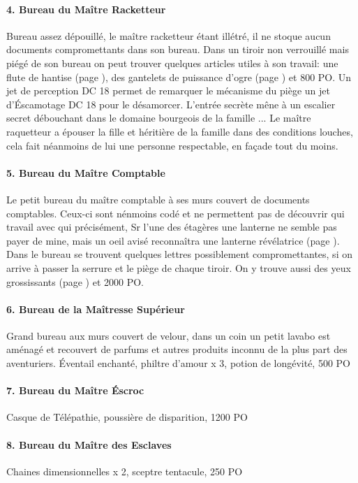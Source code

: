 \paragraph{4. Bureau du Maître Racketteur} Bureau assez dépouillé, le maître
racketteur étant illétré, il ne stoque aucun documents compromettants dans 
son bureau. Dans un tiroir non verrouillé mais piégé de son bureau on peut 
trouver quelques articles utiles à son travail: une flute de hantise (page \pageref{}), des 
gantelets de puissance d'ogre (page \pageref{}) et 800 PO. Un jet de perception DC 18 permet
de remarquer le mécanisme du piège un jet d'Éscamotage DC 18 pour le désamorcer. 
L'entrée secrète mêne à un escalier secret débouchant dans le domaine bourgeois
de la famille ... Le maître raquetteur a épouser la fille et héritière de la famille
dans des conditions louches, cela fait néanmoins de lui une personne respectable,
en façade tout du moins.

\paragraph{5. Bureau du Maître Comptable} Le petit bureau du maître comptable
à ses murs couvert de documents comptables. Ceux-ci sont nénmoins codé et ne 
permettent pas de découvrir qui travail avec qui précisément, Sr l'une des étagères
une lanterne ne semble pas payer de mine, mais un oeil avisé reconnaîtra une 
lanterne révélatrice (page \pageref{}). Dans le bureau
se trouvent quelques lettres possiblement compromettantes, si on 
arrive à passer la serrure et le piège de chaque tiroir. On y trouve aussi
des yeux grossissants (page \pageref{}) et 2000 PO.

\paragraph{6. Bureau de la Maîtresse Supérieur} Grand bureau aux murs couvert 
de velour, dans un coin un petit lavabo est aménagé et recouvert de parfums et
autres produits inconnu de la plus part des aventuriers.
Éventail enchanté, philtre d'amour x 3, potion de longévité, 500 PO

\paragraph{7. Bureau du Maître Éscroc}
Casque de Télépathie, poussière de disparition, 1200 PO

\paragraph{8. Bureau du Maître des Esclaves}
Chaines dimensionnelles x 2, sceptre tentacule, 250 PO

